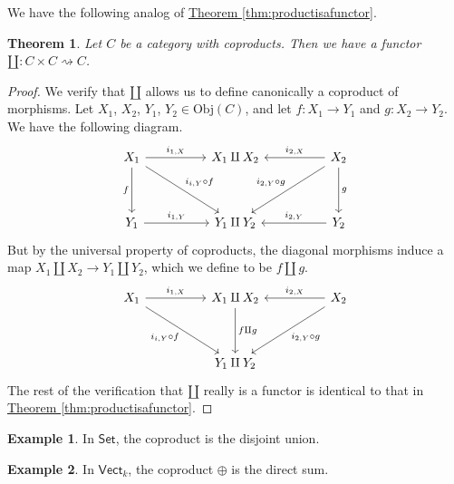 \documentclass[a4paper]{report}
\newcommand{\Obj}{\mathrm{Obj}}
\theoremstyle{definition}
\newtheorem{example}{Example}[section]
\theoremstyle{plain}
\newtheorem{theorem}{Theorem}[section]
\theoremstyle{remark}
\begin{document}
We have the following analog of \hyperref[thm:productisafunctor]{Theorem \ref*{thm:productisafunctor}}.
\begin{theorem}
  \label{thm:coproductisafunctor}
  Let $C$ be a category with coproducts. Then we have a functor $\amalg\colon C \times C \rightsquigarrow C$.
\end{theorem}
\begin{proof}
  We verify that $\amalg$ allows us to define canonically a coproduct of morphisms. Let $X_{1}$, $X_{2}$, $Y_{1}$, $Y_{2} \in \Obj(C)$, and let $f\colon X_{1} \to Y_{1}$ and $g\colon X_{2} \to Y_{2}$. We have the following diagram.
  \begin{equation*}
    \begin{tikzcd}[row sep=huge, column sep=huge]
      X_{1} \arrow[d, swap, "f"] \arrow[dr, "{i_{i,Y} \circ f}"] \arrow[r, "{i_{1, X}}"]& X_{1} \amalg X_{2} & X_{2} \arrow[dl, swap, "{i_{2, Y} \circ g}"] \arrow[ d, "g"] \arrow[l, swap, "{i_{2, X}}"] \\
      Y_{1} \arrow[r, "{i_{1, Y}}"]& Y_{1} \amalg Y_{2} & Y_{2} \arrow[l, swap, "{i_{2, Y}}"]
    \end{tikzcd}
  \end{equation*}
  But by the universal property of coproducts, the diagonal morphisms induce a map $X_{1} \amalg X_{2} \to Y_{1} \amalg Y_{2}$, which we define to be $f \amalg g$.
  \begin{equation*}
    \begin{tikzcd}[row sep=huge, column sep=huge]
      X_{1} \arrow[dr, swap, "{i_{i,Y} \circ f}"] \arrow[r, "{i_{1, X}}"]& X_{1} \arrow[d, "f \amalg g"] \amalg X_{2} & X_{2} \arrow[dl, "{i_{2, Y} \circ g}"] \arrow[l, swap, "{i_{2, X}}"] \\
      & Y_{1} \amalg Y_{2} &
    \end{tikzcd}
  \end{equation*}
  The rest of the verification that $\amalg$ really is a functor is identical to that in \hyperref[thm:productisafunctor]{Theorem \ref*{thm:productisafunctor}}.
\end{proof}

\begin{example}
  In $\mathsf{Set}$, the coproduct is the disjoint union. 
\end{example}

\begin{example}
  In $\mathsf{Vect}_{k}$, the coproduct $\oplus$ is the direct sum.
\end{example}
\end{document}
